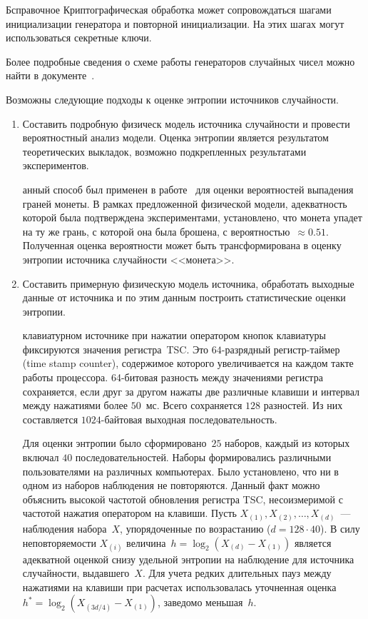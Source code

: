 \begin{appendix}{Б}{справочное}
Криптографическая обработка может сопровождаться шагами инициализации 
генератора и повторной инициализации. На этих шагах могут использоваться 
секретные ключи.

Более подробные сведения о схеме работы генераторов случайных чисел 
можно найти в документе~\cite{AIS31}.

\label{RNG.Entropy}

Возможны следующие подходы к оценке энтропии источников случайности.

\begin{enumerate}
\item 
Составить подробную физическ модель источника 
случайности и провести вероятностный анализ модели. Оценка энтропии 
является результатом теоретических выкладок, возможно подкрепленных 
результатами экспериментов. 

\begin{example*}
анный способ был применен в работе~\cite{DHM07} для оценки вероятностей
выпадения граней монеты. 
%
В рамках предложенной физической модели, адекватность
которой была подтверждена экспериментами, установлено, что монета упадет на
ту же грань, с которой она была брошена, с вероятностью~$\approx 0.51$.
%
Полученная оценка вероятности может быть трансформирована в оценку энтропии
источника случайности <<монета>>.
\end{example*}

\item 
Составить примерную физическую модель источника, 
обработать выходные данные от источника и по этим данным построить
статистические оценки энтропии. 

\begin{example*}
 клавиатурном источнике при нажатии оператором кнопок клавиатуры 
фиксируются значения регистра~TSC. Это $64$-разрядный регистр-таймер (time 
stamp counter), содержимое которого увеличивается на каждом такте работы 
процессора.
%
%
64-битовая разность между значениями регистра сохраняется, если друг за другом 
нажаты две различные клавиши и интервал между нажатиями более $50$~мс. 
Всего сохраняется $128$ разностей. Из них составляется $1024$-байтовая 
выходная последовательность.

Для оценки энтропии было сформировано~$25$ наборов, 
каждый из которых включал $40$ последовательностей.
%
Наборы формировались различными пользователями на различных компьютерах. 
%
Было установлено, что ни в одном из наборов наблюдения не повторяются.
Данный факт можно объяснить высокой частотой обновления регистра TSC,
несоизмеримой с частотой нажатия оператором на клавиши.
%
Пусть $X_{(1)},X_{(2)},\ldots,X_{(d)}$~--- наблюдения набора~$X$, 
упорядоченные по возрастанию ($d=128\cdot 40$). 
%
В силу неповторяемости $X_{(i)}$ величина~$h=\log_2(X_{(d)}-X_{(1)})$
является адекватной оценкой снизу удельной энтропии на наблюдение для 
источника случайности, выдавшего~$X$.
%
Для учета редких длительных пауз между нажатиями на клавиши
при расчетах использовалась уточненная оценка $h^*=\log_2(X_{(3d/4)}-X_{(1)})$,
заведомо меньшая~$h$.


\end{example*}
\end{enumerate}
\end{appendix}

